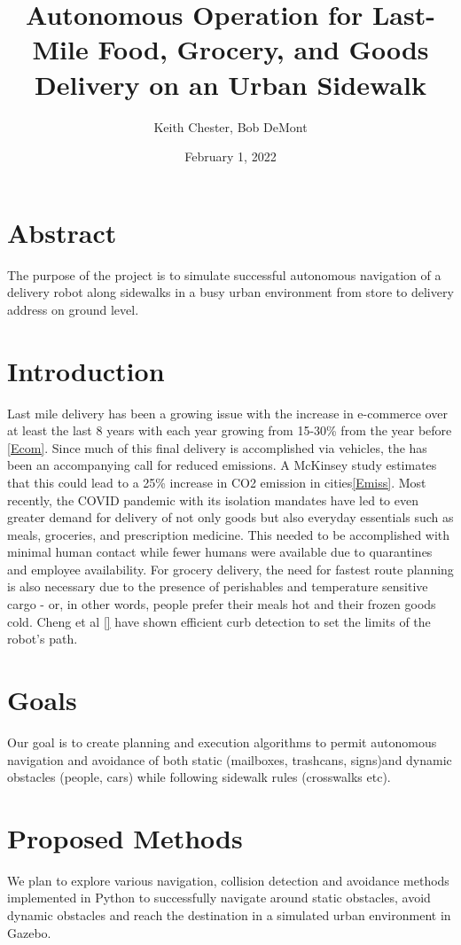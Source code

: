 \documentclass{article}
\title{Autonomous Operation for Last-Mile Food, Grocery, and Goods Delivery on an Urban Sidewalk }
\author{Keith Chester, Bob DeMont}
\date{February 1, 2022}
\begin{document}
\maketitle


\begin{multicols}{2}
\section*{Abstract}
The purpose of the project is to simulate successful autonomous navigation of a delivery robot along sidewalks in a busy urban environment from store to delivery address on ground level.

\section*{Introduction}
Last mile delivery has been a growing issue with the increase in e-commerce over at least the last 8 years with each year growing from 15-30\% from the year before \ref{Ecom}.  Since much of this final delivery is accomplished via vehicles, the has been an accompanying call for reduced emissions.  A McKinsey study estimates that this could lead to a 25\% increase in CO2 emission in cities\ref{Emiss}.  Most recently, the COVID pandemic with its isolation mandates have led to even greater demand for delivery of not only goods but also everyday essentials such as meals, groceries, and prescription medicine.  This needed to be accomplished with minimal human contact while fewer humans were available due to quarantines and employee availability.  For grocery delivery, the need for fastest route planning is also necessary due to the presence of perishables and temperature sensitive cargo - or, in other words, people prefer their meals hot and their frozen goods cold. Cheng et al \ref{} have shown efficient curb detection to set the limits of the robot's path.

\section*{Goals}
Our goal is to create planning and execution algorithms to permit autonomous navigation and avoidance of both static (mailboxes, trashcans, signs)and dynamic obstacles (people, cars) while following sidewalk rules (crosswalks etc).

\section*{Proposed Methods}
We plan to explore various navigation, collision detection and avoidance methods implemented in Python to successfully navigate around static obstacles, avoid dynamic obstacles  and reach the destination in a simulated urban environment in Gazebo.


\end{multicols}
\end{document}
